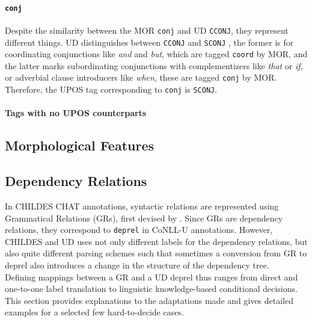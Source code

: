 \paragraph{\texttt{conj}}
Despite the similarity between the MOR \texttt{conj} and UD \texttt{CCONJ}, they represent different things. UD distinguishes between \texttt{CCONJ}  and \texttt{SCONJ} , the former is for coordinating conjunctions like \emph{and} and \emph{but}, which are tagged \texttt{coord} by MOR, and the latter marks subordinating conjunctions with complementizers like \emph{that} or \emph{if}, or adverbial clause introducers like \emph{when}, these are tagged \texttt{conj} by MOR. Therefore, the UPOS tag corresponding to \texttt{conj} is \texttt{SCONJ}.

\paragraph{Tags with no UPOS counterparts}

\subsection{Morphological Features}


\subsection{Dependency Relations}

In CHILDES CHAT annotations, syntactic relations are represented using Grammatical Relations (GRs), first devised by \cite{Sagae2004}. Since GRs are dependency relations, they correspond to \texttt{deprel} in CoNLL-U annotations. However, CHILDES and UD uses not only different labels for the dependency relations, but also quite different parsing schemes such that sometimes a conversion from GR to deprel also introduces a change in the structure of the dependency tree.\\

Defining mappings between a GR and a UD deprel thus ranges from direct and one-to-one label translation to linguistic knowledge-based conditional decisions. This section provides explanations to the adaptations made and gives detailed examples for a selected few hard-to-decide cases.\\

